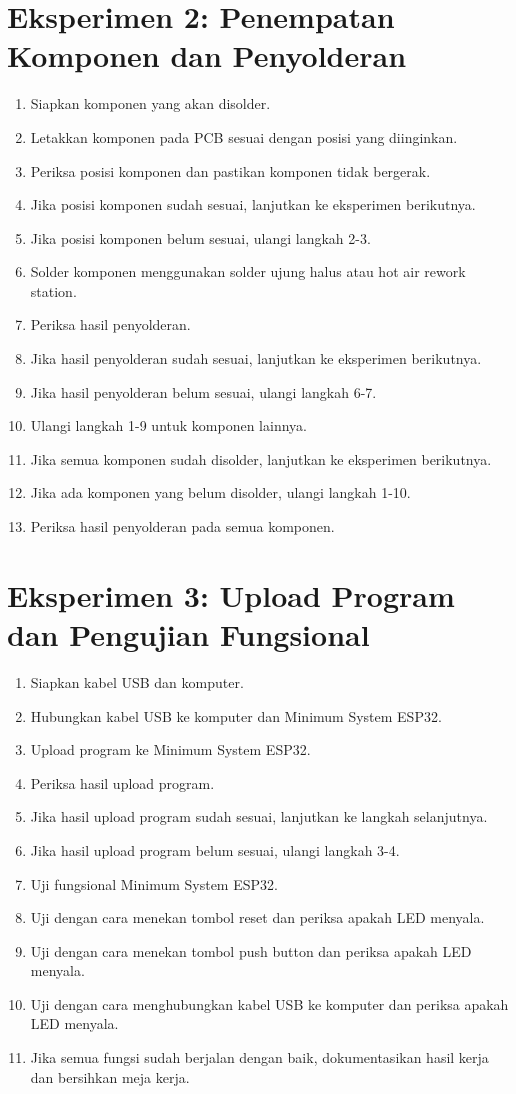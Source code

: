 \section{Eksperimen 2: Penempatan Komponen dan Penyolderan}
\begin{enumerate}
    \item Siapkan komponen yang akan disolder.
    \item Letakkan komponen pada PCB sesuai dengan posisi yang diinginkan.
    \item Periksa posisi komponen dan pastikan komponen tidak bergerak.
    \item Jika posisi komponen sudah sesuai, lanjutkan ke eksperimen berikutnya.
    \item Jika posisi komponen belum sesuai, ulangi langkah 2-3.
    \item Solder komponen menggunakan solder ujung halus atau hot air rework station.
    \item Periksa hasil penyolderan.
    \item Jika hasil penyolderan sudah sesuai, lanjutkan ke eksperimen berikutnya.
    \item Jika hasil penyolderan belum sesuai, ulangi langkah 6-7.
    \item Ulangi langkah 1-9 untuk komponen lainnya.
    \item Jika semua komponen sudah disolder, lanjutkan ke eksperimen berikutnya.
    \item Jika ada komponen yang belum disolder, ulangi langkah 1-10.
    \item Periksa hasil penyolderan pada semua komponen.
\end{enumerate}

\section{Eksperimen 3: Upload Program dan Pengujian Fungsional}
\begin{enumerate}
    \item Siapkan kabel USB dan komputer.
    \item Hubungkan kabel USB ke komputer dan Minimum System ESP32.
    \item Upload program ke Minimum System ESP32.
    \item Periksa hasil upload program.
    \item Jika hasil upload program sudah sesuai, lanjutkan ke langkah selanjutnya.
    \item Jika hasil upload program belum sesuai, ulangi langkah 3-4.
    \item Uji fungsional Minimum System ESP32.
    \item Uji dengan cara menekan tombol reset dan periksa apakah LED menyala.
    \item Uji dengan cara menekan tombol push button dan periksa apakah LED menyala.
    \item Uji dengan cara menghubungkan kabel USB ke komputer dan periksa apakah LED menyala.
    \item Jika semua fungsi sudah berjalan dengan baik, dokumentasikan hasil kerja dan bersihkan meja kerja. 
\end{enumerate}

